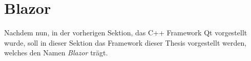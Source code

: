 \chapter{Blazor}
\label{sec:blazor}
Nachdem nun, in der vorherigen Sektion, das C++ Framework Qt vorgestellt wurde, soll in dieser
Sektion das Framework dieser Thesis vorgestellt werden, welches den Namen \emph{Blazor} trägt.






